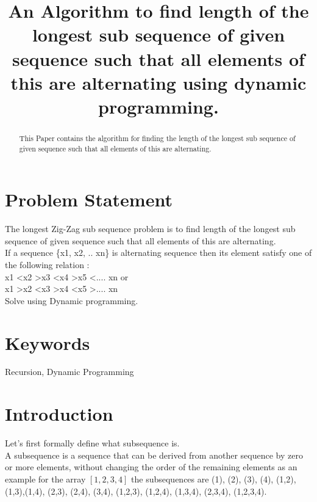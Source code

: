 \documentclass[conference]{IEEEtran}
\begin{document}
\title{An Algorithm to find length of the longest sub sequence of given sequence such that all elements of this are alternating using dynamic programming.\\
}
\author{
\and
{}
\and
{}
}

\maketitle

\begin{abstract}
This Paper contains the algorithm for finding the length of the longest
sub sequence of given sequence such that all elements of this are alternating.
\end{abstract}

\section{Problem Statement}
The longest Zig-Zag sub sequence problem is to find length of the longest
sub sequence of given sequence such that all elements of this are
alternating.\\
If a sequence \{x1, x2, .. xn\} is alternating sequence then its element satisfy one of the following relation :\\
x1 \textless x2 \textgreater x3 \textless x4 \textgreater x5 \textless .... xn or\\
x1 \textgreater x2 \textless x3 \textgreater x4 \textless x5 \textgreater .... xn\\
Solve using Dynamic programming.
\section{Keywords}
Recursion, Dynamic Programming

\section{Introduction}
Let’s  first  formally  define  what  subsequence is.\\
A subsequence is a sequence that can be derived from another sequence by zero or more elements, without changing the order of the remaining elements as an example for the array $\displaystyle{\left[{1},{2},{3},{4}\right]}$ the subsequences are (1), (2), (3), (4), (1,2), (1,3),(1,4), (2,3), (2,4), (3,4), (1,2,3), (1,2,4), (1,3,4), (2,3,4), (1,2,3,4). 
\end{document}
